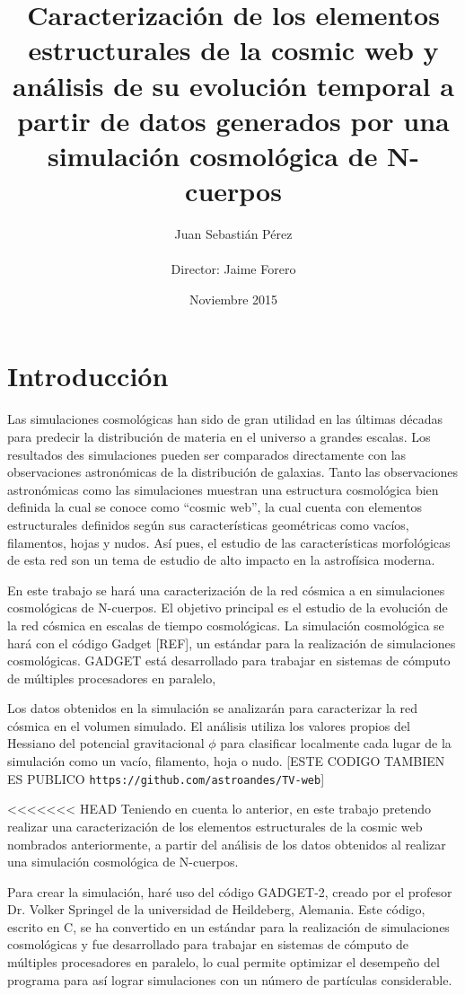 \documentclass{article}
\title{Caracterización de los elementos estructurales de la cosmic web y análisis de su evolución temporal a partir de datos generados por una simulación cosmológica de N-cuerpos}
\author{Juan Sebastián Pérez\\ \\Director: Jaime Forero}
\date{Noviembre 2015}
\begin{document}
\maketitle

\section{Introducción}

Las simulaciones cosmológicas han sido de gran utilidad en 
las últimas décadas para predecir la distribuci\'on de materia 
en el universo a grandes escalas.
Los resultados des simulaciones pueden ser comparados
directamente con las observaciones astron\'omicas de la distribuci\'on
de galaxias. 
Tanto las observaciones astronómicas como las simulaciones muestran
una estructura cosmológica bien definida la cual se conoce como
“cosmic web”, la cual cuenta con elementos 
estructurales definidos según sus características geométricas como
vacíos, filamentos, hojas y nudos.  
Así pues, el estudio de las  características morfológicas de esta red
son un tema de estudio de alto impacto en la astrofísica moderna. 

En este trabajo se har\'a una caracterización de la red c\'osmica a
en simulaciones cosmológicas de N-cuerpos. 
El objetivo principal es el estudio de la evoluci\'on de la red
c\'osmica en escalas de tiempo cosmol\'ogicas.
La simulación cosmol\'ogica se hará con el c\'odigo Gadget [REF], 
un estándar para la realización de simulaciones cosmológicas. GADGET
est\'a desarrollado para trabajar en sistemas de cómputo de múltiples
procesadores en paralelo, 


Los datos obtenidos en la simulación se analizar\'an para caracterizar
la red c\'osmica en el volumen simulado. 
El an\'alisis  utiliza los valores propios del Hessiano del potencial
gravitacional $\phi$ para clasificar localmente cada lugar de la
simulaci\'on como un vac\'io, filamento, hoja o nudo.
[ESTE CODIGO TAMBIEN ES PUBLICO \verb"https://github.com/astroandes/TV-web"]

<<<<<<< HEAD
Teniendo en cuenta lo anterior, en este trabajo pretendo realizar una caracterización de los elementos estructurales de la cosmic web nombrados anteriormente, a partir del análisis de los datos obtenidos al realizar una simulación cosmológica de N-cuerpos. 

Para crear la simulación, haré uso del código GADGET-2\cite{Gadget}, creado por el profesor Dr. Volker Springel de la universidad de Heildeberg, Alemania. Este código, escrito en C, se ha convertido en un estándar para la realización de simulaciones cosmológicas y fue desarrollado para trabajar en sistemas de cómputo de múltiples procesadores en paralelo, lo cual permite optimizar el desempeño del programa para así lograr simulaciones con un número de partículas considerable.
\end{document}
